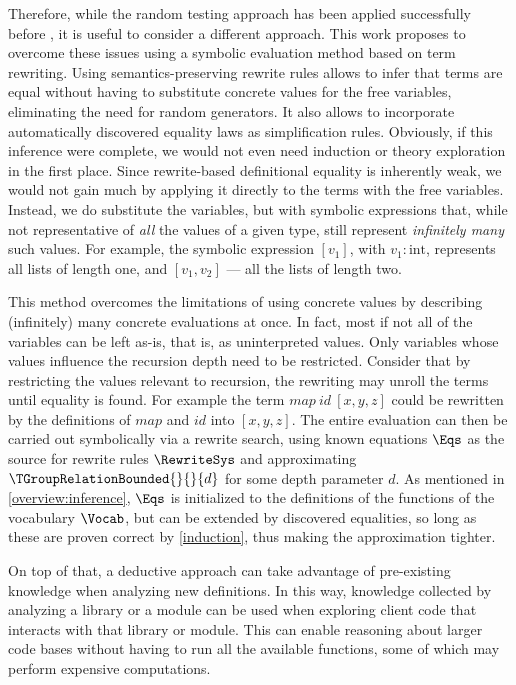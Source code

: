 Therefore, while the random testing approach has been applied successfully before \cite{JFP2017:Smallbonequickspec2,ICAD2013:Claessen,hipstercond,ITP2017:Johansson,2018AISC:Einarsdottir}, it is useful to consider a different approach. 
This work proposes to overcome these issues using a symbolic evaluation method based on term rewriting.
Using semantics-preserving rewrite rules allows to infer that terms are equal without having to
substitute concrete values for the free variables, eliminating the need for random generators.
It also allows to incorporate automatically discovered equality laws as simplification rules.
Obviously, if this inference were complete, we would not even need induction or theory exploration in
the first place.
Since rewrite-based definitional equality is inherently weak, we would not gain much by applying it
directly to the terms with the free variables.
Instead, we do substitute the variables, but with symbolic expressions that, while not representative of
\emph{all} the values of a given type, still represent \emph{infinitely many} such values.
For example, the symbolic expression $[v_1]$, with $v_1:\textrm{int}$, represents all lists of length one,
and $[v_1, v_2]$ --- all the lists of length two.

This method overcomes the limitations of using concrete values by describing (infinitely) many
concrete evaluations at once.
In fact, most if not all of the variables can be left as-is, that is, as uninterpreted values.
Only variables whose values influence the recursion depth need to be restricted.
Consider that by restricting the values relevant to recursion, the rewriting may unroll the terms until equality is found.
For example the term $map~id~[x,y,z]$ could be rewritten by the definitions of $map$ and $id$ into $[x,y,z]$.
The entire evaluation can then be carried out symbolically via a rewrite search, using known equations
$\Eqs$ as the source for rewrite rules $\RewriteSys$ and approximating $\TGroupRelationBounded{}{}{d}$
for some depth parameter $d$.
As mentioned in \autoref{overview:inference}, $\Eqs$ is initialized to the definitions of the functions
of the vocabulary $\Vocab$, but can be extended by discovered equalities, so long as these are proven
correct by \autoref{induction}, thus making the approximation tighter.

On top of that, a deductive approach can take advantage of pre-existing knowledge when analyzing new definitions.
In this way, knowledge collected by analyzing a library or a module can be used when exploring client code that interacts with that library or module.
This can enable reasoning about larger code bases without having to run all the available functions, some of which may perform expensive computations.


